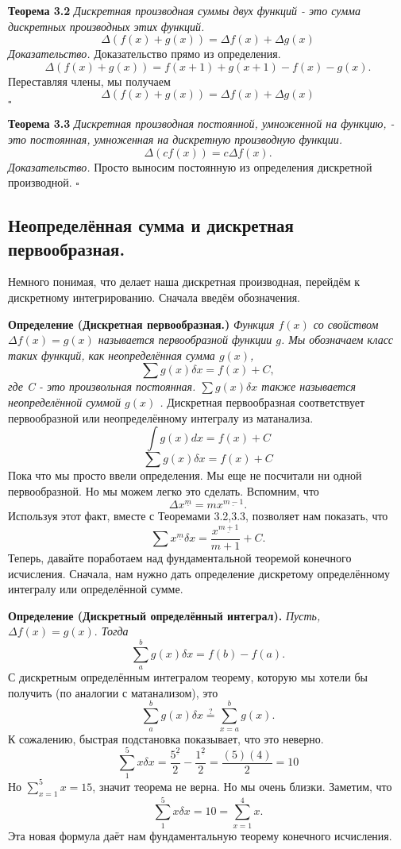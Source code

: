 \documentclass{article}
\newcommand{\ff}[1]{%
  ^{\underline{#1}}%
}
\begin{document}
\textbf{Теорема 3.2} \textit{Дискретная производная суммы двух функций - это сумма дискретных производных этих функций.}
$$\Delta (f(x)+g(x))=\Delta f(x) + \Delta g(x)$$
\textit{Доказательство.} Доказательство прямо из определения.
$$\Delta (f(x)+g(x))=f(x+1)+g(x+1)-f(x)-g(x).$$
Переставляя члены, мы получаем
$$\Delta (f(x)+g(x))=\Delta f(x) + \Delta g(x)$$
$\square$

\textbf{Теорема 3.3} \textit{Дискретная производная постоянной, умноженной на функцию, - это постоянная, умноженная на дискретную производную функции.}
$$\Delta(cf(x))=c\Delta f(x).$$
\textit{Доказательство.} Просто выносим постоянную из определения дискретной производной.
$\square$
\subsection{Неопределённая сумма и дискретная первообразная.}
Немного понимая, что делает наша дискретная производная, перейдём к дискретному интегрированию. Сначала введём обозначения.

\textbf{Определение (Дискретная первообразная.)} \textit{Функция $f(x)$ со свойством $\Delta f(x)=g(x)$ называется первообразной функции $g$. Мы обозначаем класс таких функций, как неопределённая сумма $g(x)$,}
$$\sum g(x) \delta x =f(x)+C,$$
\textit{где C - это произвольная постоянная. $\sum g(x) \delta x$ также называется неопределённой суммой $g(x)$ .}
Дискретная первообразная соответствует первообразной или неопределённому интегралу из матанализа.
$$\int g(x) dx=f(x)+C$$
$$\sum g(x) \delta x=f(x)+C$$
Пока что мы просто ввели определения. Мы еще не посчитали ни одной первообразной. Но мы можем легко это сделать. Вспомним, что
$$\Delta x\ff{m}=mx\ff{m-1}.$$
Используя этот факт, вместе с Теоремами 3.2,3.3, позволяет нам показать, что
$$\sum x\ff{m} \delta x=\frac{x\ff{m+1}}{m+1}+C.$$
Теперь, давайте поработаем над фундаментальной теоремой конечного исчисления. Сначала, нам нужно дать определение дискретому определённому интегралу или определённой сумме.

\textbf{Определение (Дискретный определённый интеграл).} \textit{Пусть, $\Delta f(x)=g(x).$ Тогда}
$$\sum_a^b g(x) \delta x=f(b)-f(a).$$
С дискретным определённым интегралом теорему, которую мы хотели бы получить (по аналогии с матанализом), это
$$\sum_a^b g(x) \delta x \stackrel{?}{=} \sum_{x=a}^b g(x).$$
К сожалению, быстрая подстановка показывает, что это неверно.
$$\sum_1^5 x \delta x=\frac{5\ff{2}}{2}-\frac{1\ff{2}}{2}=\frac{(5)(4)}{2}=10$$
Но $\sum_{x=1}^5 x=15$, значит теорема не верна. Но мы очень близки. Заметим, что
$$\sum_1^5 x \delta x=10=\sum_{x=1}^4 x.$$
Эта новая формула даёт нам фундаментальную теорему конечного исчисления.
\end{document}
